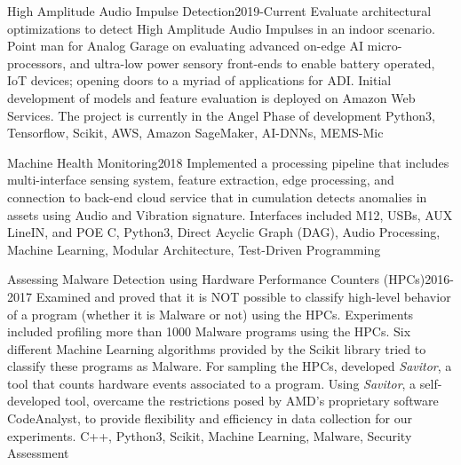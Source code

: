 %
%
%

\emptySeparator
{}
\begin{projects}
	\project
	{High Amplitude Audio Impulse Detection}{2019-Current}
	{}
	{Evaluate architectural optimizations to detect High Amplitude Audio Impulses in an indoor scenario. Point man for Analog Garage on evaluating advanced on-edge AI micro-processors, and ultra-low power sensory front-ends to enable battery operated, IoT devices; opening doors to a myriad of applications for ADI. Initial development of models and feature evaluation is deployed on Amazon Web Services. The project is currently in the Angel Phase of development}
	{Python3, Tensorflow, Scikit, AWS, Amazon SageMaker, AI-DNNs, MEMS-Mic}

	\project
	{Machine Health Monitoring}{2018}
	{}
	{Implemented a processing pipeline that includes multi-interface sensing system, feature extraction, edge processing, and connection to back-end cloud service that in cumulation detects anomalies in assets using Audio and Vibration signature. Interfaces included M12, USBs, AUX LineIN, and POE}
	{C, Python3, Direct Acyclic Graph (DAG), Audio Processing, Machine Learning, Modular Architecture, Test-Driven Programming}

	\project
	{Assessing Malware Detection using Hardware Performance Counters (HPCs)}{2016-2017}
	{}
	{Examined and proved that it is NOT possible to classify high-level behavior of a program (whether it is Malware or not) using the HPCs. Experiments included profiling more than 1000 Malware programs using the HPCs. Six different Machine Learning algorithms provided by the Scikit library tried to classify these programs as Malware. For sampling the HPCs, developed \textit{Savitor}, a tool that counts hardware events associated to a program. Using \textit{Savitor}, a self-developed tool, overcame the restrictions posed by AMD’s proprietary software CodeAnalyst, to provide flexibility and efficiency in data collection for our experiments.}
	{C++, Python3, Scikit, Machine Learning, Malware, Security Assessment}

				

\end{projects}
